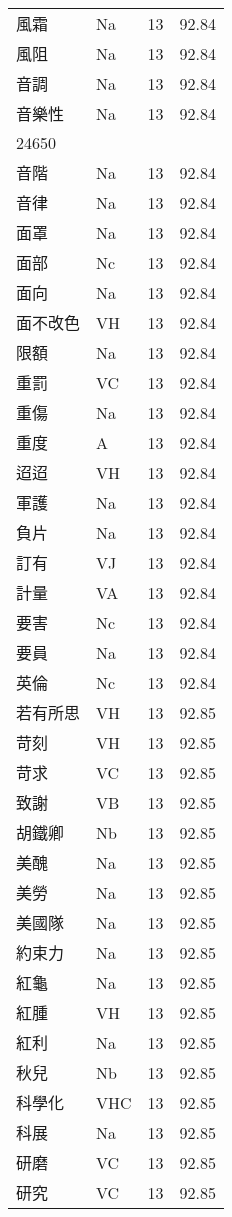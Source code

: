 \documentclass[twocolumn]{book}
\begin{document}
\begin{supertabular}{llrr}
風霜 & Na & 13 &  92.84\\
風阻 & Na & 13 &  92.84\\
音調 & Na & 13 &  92.84\\
音樂性 & Na & 13 &  92.84\\
24650\\
音階 & Na & 13 &  92.84\\
音律 & Na & 13 &  92.84\\
面罩 & Na & 13 &  92.84\\
面部 & Nc & 13 &  92.84\\
面向 & Na & 13 &  92.84\\
面不改色 & VH & 13 &  92.84\\
限額 & Na & 13 &  92.84\\
重罰 & VC & 13 &  92.84\\
重傷 & Na & 13 &  92.84\\
重度 & A & 13 &  92.84\\
迢迢 & VH & 13 &  92.84\\
軍護 & Na & 13 &  92.84\\
負片 & Na & 13 &  92.84\\
訂有 & VJ & 13 &  92.84\\
計量 & VA & 13 &  92.84\\
要害 & Nc & 13 &  92.84\\
要員 & Na & 13 &  92.84\\
英倫 & Nc & 13 &  92.84\\
若有所思 & VH & 13 &  92.85\\
苛刻 & VH & 13 &  92.85\\
苛求 & VC & 13 &  92.85\\
致謝 & VB & 13 &  92.85\\
胡鐵卿 & Nb & 13 &  92.85\\
美醜 & Na & 13 &  92.85\\
美勞 & Na & 13 &  92.85\\
美國隊 & Na & 13 &  92.85\\
約束力 & Na & 13 &  92.85\\
紅龜 & Na & 13 &  92.85\\
紅腫 & VH & 13 &  92.85\\
紅利 & Na & 13 &  92.85\\
秋兒 & Nb & 13 &  92.85\\
科學化 & VHC & 13 &  92.85\\
科展 & Na & 13 &  92.85\\
研磨 & VC & 13 &  92.85\\
研究 & VC & 13 &  92.85\\

\end{supertabular}
\end{document}
